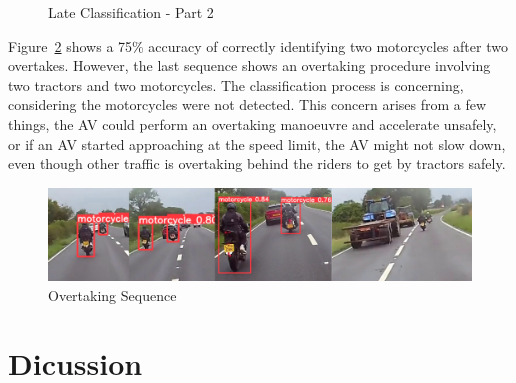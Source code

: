 \documentclass[12pt]{report} %
\begin{document}
\begin{figure}[h]
\begin{floatrow}
			{
				\caption{Late Classification - Part 2}
				\label{fig:lateClassificationP2}
			}
		\end{floatrow}
	\end{figure}

	Figure~\ref{fig:overtakingSequence} shows a 75\% accuracy of correctly identifying two motorcycles after two overtakes. However, the last sequence shows an overtaking procedure involving two tractors and two motorcycles. The classification process is concerning, considering the motorcycles were not detected. This concern arises from a few things, the AV could perform an overtaking manoeuvre and accelerate unsafely, or if an AV started approaching at the speed limit, the AV might not slow down, even though other traffic is overtaking behind the riders to get by tractors safely.
	\begin{figure}[h]
		\centering
		\includegraphics[width=\columnwidth]{Figures/scenarios/motorcycle_overtaking_sequence.png}
		\caption{Overtaking Sequence}
		\label{fig:overtakingSequence}
	\end{figure}

\chapter{Dicussion}
\label{chap:discussion}
\end{document}
